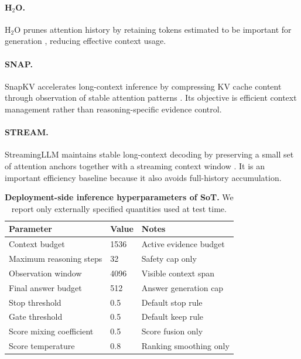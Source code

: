 \paragraph{\textbf{H\(_2\)O}.}
H\(_2\)O prunes attention history by retaining tokens estimated to be important for generation \citep{zhang2023h2o}, reducing effective context usage.

\paragraph{\textbf{SNAP}.}
SnapKV accelerates long-context inference by compressing KV cache content through observation of stable attention patterns \citep{li2024snapkv}.
Its objective is efficient context management rather than reasoning-specific evidence control.

\paragraph{\textbf{STREAM}.}
StreamingLLM maintains stable long-context decoding by preserving a small set of attention anchors together with a streaming context window \citep{xiao2023streamingllm}.
It is an important efficiency baseline because it also avoids full-history accumulation.

\begin{table}[!t]
\centering
\caption{\textbf{Deployment-side inference hyperparameters of SoT.} We report only externally specified quantities used at test time.}
\vspace{-2mm}
\label{tab:app_hparam_sot}
\footnotesize
\setlength{\tabcolsep}{5.2pt}
\renewcommand{\arraystretch}{0.95}
\begin{tabular}{lll}
\toprule
\textbf{Parameter} & \textbf{Value} & \textbf{Notes} \\
\midrule
Context budget & 1536 & Active evidence budget \\
Maximum reasoning steps & 32 & Safety cap only \\
Observation window & 4096 & Visible context span \\
Final answer budget & 512 & Answer generation cap \\
Stop threshold & 0.5 & Default stop rule \\
Gate threshold & 0.5 & Default keep rule \\
Score mixing coefficient & 0.5 & Score fusion only \\
Score temperature & 0.8 & Ranking smoothing only \\
\bottomrule
\end{tabular}
\vspace{-5mm}
\end{table}

